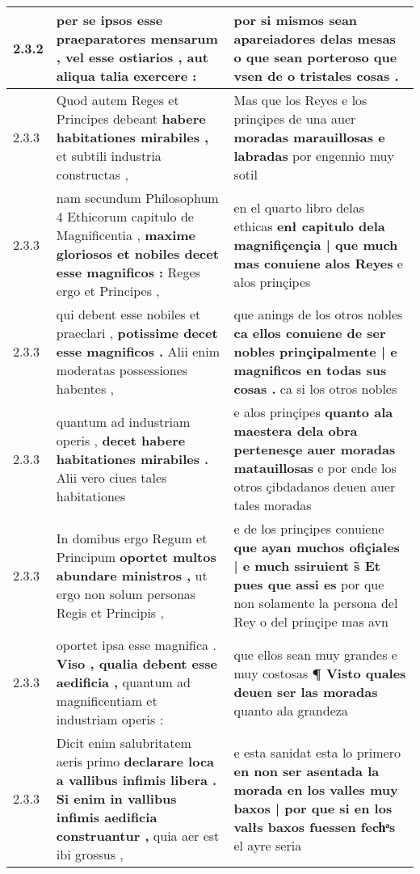 \begin{tabular}{|p{1cm}|p{6.5cm}|p{6.5cm}|}
2.3.2 & per se ipsos esse praeparatores mensarum , \textbf{ vel esse ostiarios , } aut aliqua talia exercere : & por si mismos sean apareiadores delas mesas \textbf{ o que sean porteroso } que vsen de o tristales cosas . \\\hline
2.3.3 & Quod autem Reges et Principes debeant \textbf{ habere habitationes mirabiles , } et subtili industria constructas , & Mas que los Reyes e los prinçipes de una auer \textbf{ moradas marauillosas e labradas } por engennio muy sotil \\\hline
2.3.3 & nam secundum Philosophum 4 Ethicorum capitulo de Magnificentia , \textbf{ maxime gloriosos et nobiles decet esse magnificos : } Reges ergo et Principes , & en el quarto libro delas ethicas \textbf{ enł capitulo dela magnifiçençia | que much mas conuiene alos Reyes } e alos prinçipes \\\hline
2.3.3 & qui debent esse nobiles et praeclari , \textbf{ potissime decet esse magnificos . } Alii enim moderatas possessiones habentes , & que anings de los otros nobles \textbf{ ca ellos conuiene de ser nobles prinçipalmente | e magnificos en todas sus cosas . } ca si los otros nobles \\\hline
2.3.3 & quantum ad industriam operis , \textbf{ decet habere habitationes mirabiles . } Alii vero ciues tales habitationes & e alos prinçipes \textbf{ quanto ala maestera dela obra pertenesçe auer moradas matauillosas } e por ende los otros çibdadanos deuen auer tales moradas \\\hline
2.3.3 & In domibus ergo Regum et Principum \textbf{ oportet multos abundare ministros , } ut ergo non solum personas Regis et Principis , & e de los prinçipes conuiene \textbf{ que ayan muchos ofiçiales | e much ssiruient s̃ Et pues que assi es } por que non solamente la persona del Rey o del prinçipe mas avn \\\hline
2.3.3 & oportet ipsa esse magnifica . \textbf{ Viso , qualia debent esse aedificia , } quantum ad magnificentiam et industriam operis : & que ellos sean muy grandes e muy costosas \textbf{ ¶ Visto quales deuen ser las moradas } quanto ala grandeza \\\hline
2.3.3 & Dicit enim salubritatem aeris primo \textbf{ declarare loca a vallibus infimis libera . Si enim in vallibus infimis aedificia construantur , } quia aer est ibi grossus , & e esta sanidat esta lo primero \textbf{ en non ser asentada la morada en los valles muy baxos | por que si en los valłs baxos fuessen fechͣs } el ayre seria \\\hline

\end{tabular}

